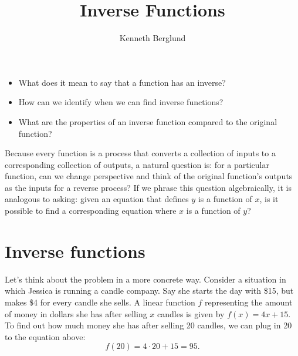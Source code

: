 \documentclass[nooutcomes]{ximera}
\author{Kenneth Berglund}
\title{Inverse Functions}
\begin{document}
\licenseAPCSZ
\begin{abstract}
  
\end{abstract}
\maketitle



\begin{motivatingQuestions}\begin{itemize}
\item What does it mean to say that a function has an inverse? 
\item How can we identify when we can find inverse functions?
\item What are the properties of an inverse function compared to the original function?
\end{itemize}\end{motivatingQuestions}



Because every function is a process that converts a collection of inputs to a corresponding collection of outputs, a natural question is: for a particular function, can we change perspective and think of the original function's outputs as the inputs for a reverse process? If we phrase this question algebraically, it is analogous to asking: given an equation that defines $y$ is a function of $x$, is it possible to find a corresponding equation where $x$ is a function of $y$?



\section{Inverse functions}
Let's think about the problem in a more concrete way. Consider a situation in which Jessica is running a candle company. Say she starts the day with \$15, but makes \$4 for every candle she sells. A linear function $f$ representing the amount of money in dollars she has after selling $x$ candles is given by $f(x) = 4x + 15$. To find out how much money she has after selling 20 candles, we can plug in 20 to the equation above:
$$
f(20) = 4\cdot 20 + 15 = 95.
$$
\end{document}
